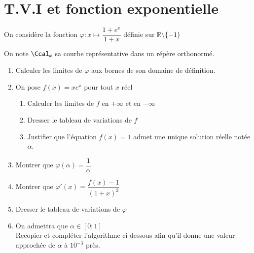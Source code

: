 \documentclass[oneside,12pt]{article}
\let\oldsection\section
\renewcommand{\section}{\newpage\oldsection}
\begin{document}
\section{T.V.I et fonction exponentielle}
On considère la fonction $\varphi : x \mapsto \dfrac{1 + e^x}{1 + x}$ définie sur $\mathbb{R} \setminus \{-1\}$

On note $\Ccal_\varphi$ sa courbe représentative dans un répère orthonormé.
\begin{enumerate}
    \item Calculer les limites de $\varphi$ aux bornes de son domaine de définition.
    \item On pose $f(x) = x e^x$ \quad pour tout $x$ réel
    \begin{enumerate}
        \item Calculer les limites de $f$ en $+\infty$ et en $-\infty$
        \item Dresser le tableau de variations de $f$
        \item Justifier que l'équation $f(x) = 1$ admet une unique solution réelle notée $\alpha$.
    \end{enumerate}
    \item Montrer que $\varphi(\alpha) = \dfrac{1}{\alpha}$
    \item Montrer que $\varphi'(x) = \dfrac{f(x) - 1}{(1 + x)^2}$
    \item Dresser le tableau de variations de $\varphi$
    \item On admettra que $\alpha\in[0;1]$\\
    Recopier et compléter l'algorithme ci-dessous afin qu'il donne une valeur approchée de $\alpha$ à $10^{-3}$ près.


\end{enumerate}
\end{document}
